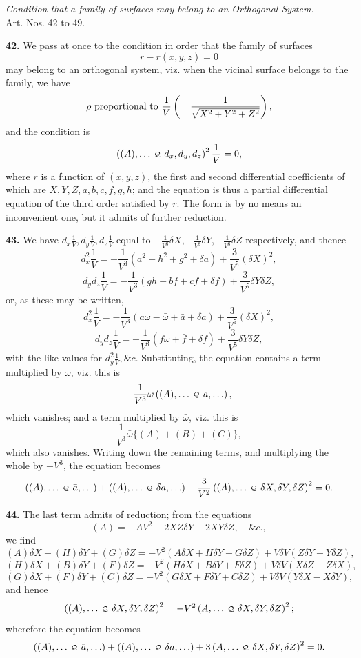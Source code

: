\documentclass[11pt,a4paper]{article}
\newcommand{\cayq}{\mathbin{\raisebox{0.08ex}{\(\scriptstyle\mathcal Q\)}}}
\newcommand{\qf}[2]{\left(#1\,\cayq\,#2\right)^2}
\newcommand{\ql}[2]{\left(#1\,\cayq\,#2\right)}
\newcommand{\Dx}{d_x}
\newcommand{\Dy}{d_y}
\newcommand{\Dz}{d_z}
\begin{document}
\newpage
\begin{center}
\textit{Condition that a family of surfaces may belong to an Orthogonal System.}\\
Art. Nos. 42 to 49.
\end{center}

\textbf{42.} We pass at once to the condition in order that the family of surfaces
\[
r-r(x,y,z)=0
\]
may belong to an orthogonal system, viz. when the vicinal surface belongs to the family, we have
\[
\rho\hbox{ proportional to }\frac1V\left(=\frac1{\sqrt{X^2+Y^2+Z^2}}\right),
\]
and the condition is
\[
\qf{(A),\ldots}{\Dx,\Dy,\Dz}\frac1V=0,
\]
where \(r\) is a function of \((x,y,z)\), the first and second differential coefficients of which
are \(X,Y,Z,a,b,c,f,g,h\); and the equation is thus a partial differential equation of
the third order satisfied by \(r\). The form is by no means an inconvenient one, but
it admits of further reduction.

\textbf{43.} We have \(\Dx\frac1V,\Dy\frac1V,\Dz\frac1V\) equal to
\(-\frac1{V^3}\delta X,-\frac1{V^3}\delta Y,-\frac1{V^3}\delta Z\) respectively,
and thence
\[
\Dx^2\frac1V=-\frac1{V^3}(a^2+h^2+g^2+\delta a)+\frac3{V^5}(\delta X)^2,
\]
\[
\Dy\Dz\frac1V=-\frac1{V^3}(gh+bf+cf+\delta f)+\frac3{V^5}\delta Y\delta Z,
\]
or, as these may be written,
\[
\Dx^2\frac1V=-\frac1{V^3}(a\omega-\bar\omega+\bar a+\delta a)+\frac3{V^5}(\delta X)^2,
\]
\[
\Dy\Dz\frac1V=-\frac1{V^3}(f\omega+\bar f+\delta f)+\frac3{V^5}\delta Y\delta Z,
\]
with the like values for \(\Dy^2\frac1V,\&c.\) Substituting, the equation contains a term
multiplied by \(\omega\), viz. this is
\[
-\frac1{V^3}\omega\ql{(A),\ldots}{a,\ldots},
\]
which vanishes; and a term multiplied by \(\bar\omega\), viz. this is
\[
\frac1{V^3}\bar\omega\{(A)+(B)+(C)\},
\]
which also vanishes. Writing down the remaining terms, and multiplying the whole by
\(-V^3\), the equation becomes
\[
\ql{(A),\ldots}{\bar a,\ldots}
+\ql{(A),\ldots}{\delta a,\ldots}
-\frac3{V^2}\qf{(A),\ldots}{\delta X,\delta Y,\delta Z}=0.
\]

\newpage
\textbf{44.} The last term admits of reduction; from the equations
\[
(A)=-AV^2+2XZ\delta Y-2XY\delta Z,\quad \&c.,
\]
we find
\[
(A)\delta X+(H)\delta Y+(G)\delta Z
=-V^2(A\delta X+H\delta Y+G\delta Z)+V\delta V(Z\delta Y-Y\delta Z),
\]
\[
(H)\delta X+(B)\delta Y+(F)\delta Z
=-V^2(H\delta X+B\delta Y+F\delta Z)+V\delta V(X\delta Z-Z\delta X),
\]
\[
(G)\delta X+(F)\delta Y+(C)\delta Z
=-V^2(G\delta X+F\delta Y+C\delta Z)+V\delta V(Y\delta X-X\delta Y),
\]
and hence
\[
\qf{(A),\ldots}{\delta X,\delta Y,\delta Z}
=-V^2\qf{A,\ldots}{\delta X,\delta Y,\delta Z};
\]
wherefore the equation becomes
\[
\ql{(A),\ldots}{\bar a,\ldots}
+\ql{(A),\ldots}{\delta a,\ldots}
+3\qf{A,\ldots}{\delta X,\delta Y,\delta Z}=0.
\]
\end{document}

